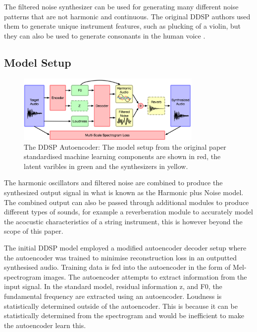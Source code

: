 The filtered noise synthesizer can be used for generating many different noise patterns that are not harmonic and continuous. The original DDSP authors used them to generate unique instrument features, such as plucking of a violin, but they can also be used to generate consonants in the human voice \cite{SingingDDSP}.

\subsection{Model Setup}

\begin{figure}[!ht]
    \centering
    \includegraphics[width=0.8\textwidth]{literature_review/DDSPArchitecture.png}
    \caption{The DDSP Autoencoder: The model setup from the original paper\cite{OriginalDDSP} standardised machine learning components are shown in red, the latent varibles in green and the synthesizers in yellow.}
    \label{fig:ddsp_model_setup}
\end{figure}

The harmonic oscillators and filtered noise are combined to produce the synthesized output signal in what is known as the Harmonic plus Noise model. The combined output can also be passed through additional modules to produce different types of sounds, for example a reverberation module to accurately model the acocustic characteristics of a string instrument, this is however beyond the scope of this paper.

The initial DDSP model\cite{OriginalDDSP} employed a modified autoencoder decoder setup where the autoencoder was trained to minimise reconstruction loss in an outputted synthesised audio. Training data is fed into the autoencoder in the form of Mel-spectrogram images. The autoencoder attempts to extract information from the input signal. In the standard model, residual information z, and F0, the fundamental frequency are extracted using an autoencoder. Loudness is statistically determined outside of the autoencoder. This is because it can be statistically determined from the spectrogram and would be inefficient to make the autoencoder learn this.

